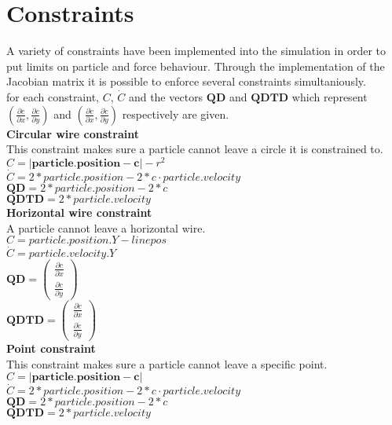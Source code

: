 \chapter{Constraints}
A variety of constraints have been implemented into the simulation in order to put limits on particle and force behaviour. Through the implementation of the Jacobian matrix it is possible to enforce several constraints simultaniously. \\
for each constraint, $C$, $\dot{C}$ and the vectors $\boldsymbol{QD}$ and $\boldsymbol{QDTD}$ which represent $(\frac{\partial c}{\partial x}, \frac{\partial c}{\partial y})$ and $(\frac{\partial\dot{c}}{\partial x}, \frac{\partial \dot{c}}{\partial y})$ respectively are given.  \\ 

\smallskip
\textbf{Circular wire constraint} \\
This constraint makes sure a particle cannot leave a circle it is constrained to. \\
$C = |\boldsymbol{particle.position} - \boldsymbol{c}| - r^2$ 
$\dot{C} =2 * particle.position - 2 * c \cdot particle.velocity$ \\
$\boldsymbol{QD} = 2*particle.position - 2*c$ \\
$\boldsymbol{QDTD}= 2*particle.velocity$\\

\smallskip
\textbf{Horizontal wire constraint} \\
A particle cannot leave a horizontal wire. \\
$C = particle.position.Y -linepos$ \\
$\dot{C} = particle.velocity.Y$ \\
$\boldsymbol{QD} =\begin{pmatrix} \frac{\partial c}{\partial x} \\ \frac{\partial c}{\partial y}  \end{pmatrix}$ \\
$\boldsymbol{QDTD}=\begin{pmatrix} \frac{\partial\dot{c}}{\partial x} \\ \frac{\partial \dot{c}}{\partial y}  \end{pmatrix}$ \\

\pagebreak
\textbf{Point constraint} \\
This constraint makes sure a particle cannot leave a specific point.\\
$C = |\boldsymbol{particle.position} - \boldsymbol{c}|$ \\
$\dot{C} =2 * particle.position - 2 * c \cdot particle.velocity$ \\
$\boldsymbol{QD} = 2*particle.position - 2*c$ \\
$\boldsymbol{QDTD}= 2*particle.velocity$\\

